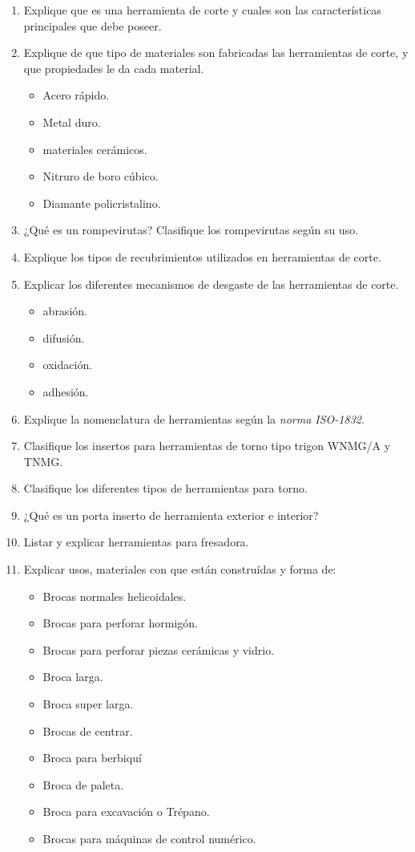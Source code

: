\documentclass[a4paper]{article}
\begin{document}
\begin{enumerate}
    \item Explique que es una herramienta de corte y cuales son las características principales que debe poseer.
    \item Explique de que tipo de materiales son fabricadas las herramientas de corte, y que propiedades le da cada material.
    \begin{itemize}
      \item Acero rápido.
      \item Metal duro.
      \item materiales cerámicos.
      \item Nitruro de boro cúbico.
      \item Diamante policristalino.
    \end{itemize}
    \item ¿Qué es un rompevirutas? Clasifique los rompevirutas según su uso.
    \item Explique los tipos de recubrimientos utilizados en herramientas de corte.
    \item Explicar los diferentes mecanismos de desgaste de las herramientas de corte.
    \begin{itemize}
      \item abrasión.
      \item difusión.
      \item oxidación.
      \item adhesión.
    \end{itemize}
    \item Explique la nomenclatura de herramientas según la \textit{norma ISO-1832}.
    \item Clasifique los insertos para herramientas de torno tipo trigon WNMG/A y TNMG.
    \item Clasifique los diferentes tipos de herramientas para torno.
    \item ¿Qué es un porta inserto de herramienta exterior e interior?
    \item Listar y explicar herramientas para fresadora.
    \item Explicar usos, materiales con que están construídas y forma de:
    \begin{itemize}
      \item Brocas normales helicoidales.
      \item Brocas para perforar hormigón.
      \item Brocas para perforar piezas cerámicas y vidrio.
      \item Broca larga.
      \item Broca super larga.
      \item Brocas de centrar.
      \item Broca para berbiquí
      \item Broca de paleta.
      \item Broca para excavación o Trépano.
      \item Brocas para máquinas de control numérico.
    \end{itemize} 
\end{enumerate}
\end{document}
